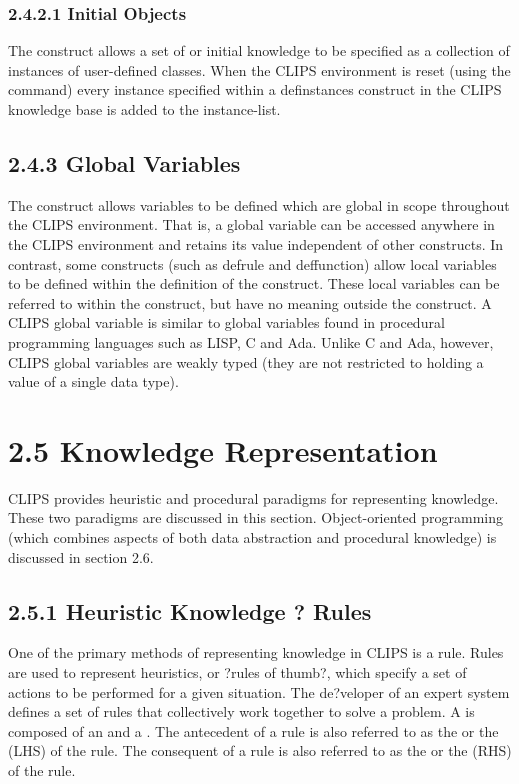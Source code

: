 \documentclass[letterpaper,10pt,english]{sphinxmanual}
\begin{document}
\subsubsection{2.4.2.1 Initial Objects}
\label{\detokenize{overview:initial-objects}}
The  construct allows a set of  or initial
knowledge to be specified as a collection of instances of user-defined
classes. When the CLIPS environment is reset (using the 
command) every instance specified within a definstances construct in the
CLIPS knowledge base is added to the instance-list.


\subsection{2.4.3 Global Variables}
\label{\detokenize{overview:global-variables}}
The  construct allows variables to be defined which are
global in scope throughout the CLIPS environment. That is, a global
variable can be accessed anywhere in the CLIPS environment and retains
its value independent of other constructs. In contrast, some constructs
(such as defrule and deffunction) allow local variables to be defined
within the definition of the construct. These local variables can be
referred to within the construct, but have no meaning outside the
construct. A CLIPS global variable is similar to global variables found
in procedural programming languages such as LISP, C and Ada. Unlike C
and Ada, however, CLIPS global variables are weakly typed (they are not
restricted to holding a value of a single data type).


\section{2.5 Knowledge Representation}
\label{\detokenize{overview:knowledge-representation}}
CLIPS provides heuristic and procedural paradigms for representing
knowledge. These two paradigms are discussed in this section.
Object-oriented programming (which combines aspects of both data
abstraction and procedural knowledge) is discussed in section 2.6.


\subsection{2.5.1 Heuristic Knowledge ? Rules}
\label{\detokenize{overview:heuristic-knowledge-rules}}
One of the primary methods of representing knowledge in CLIPS is a rule.
Rules are used to represent heuristics, or ?rules of thumb?, which
specify a set of actions to be performed for a given situation. The
de?veloper of an expert system defines a set of rules that collectively
work together to solve a problem. A  is composed of an
 and a . The antecedent of a rule is also
referred to as the  or the  (LHS) of the
rule. The consequent of a rule is also referred to as the  or the  (RHS) of the rule.
\end{document}
